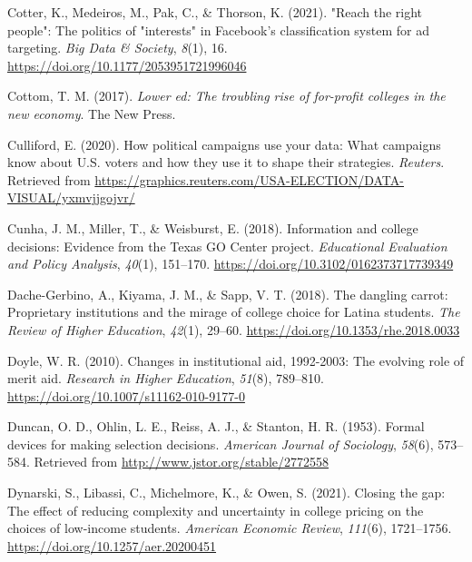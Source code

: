 \documentclass[
  12pt,
]{article}
\newlength{\cslhangindent}
\newlength{\cslentryspacingunit} %
\newenvironment{CSLReferences}[2] %
 {%
  \setlength{\parindent}{0pt}
  \ifodd #1
  \let\oldpar\par
  \def\par{\hangindent=\cslhangindent\oldpar}
  \fi
  \setlength{\parskip}{#2\cslentryspacingunit}
 }%
 {}
\begin{document}
\begin{CSLReferences}{1}{0}
\leavevmode{}%
Cotter, K., Medeiros, M., Pak, C., \& Thorson, K. (2021). "Reach the right people": The politics of "interests" in {F}acebook's classification system for ad targeting. \emph{Big Data \& Society}, \emph{8}(1), 16. \url{https://doi.org/10.1177/2053951721996046}

\leavevmode{}%
Cottom, T. M. (2017). \emph{Lower ed: {The} troubling rise of for-profit colleges in the new economy}. The New Press.

\leavevmode{}%
Culliford, E. (2020). How political campaigns use your data: {What} campaigns know about {U.S.} {voters} and how they use it to shape their strategies. \emph{Reuters}. Retrieved from \url{https://graphics.reuters.com/USA-ELECTION/DATA-VISUAL/yxmvjjgojvr/}

\leavevmode{}%
Cunha, J. M., Miller, T., \& Weisburst, E. (2018). Information and college decisions: Evidence from the {Texas GO Center} project. \emph{Educational Evaluation and Policy Analysis}, \emph{40}(1), 151--170. \url{https://doi.org/10.3102/0162373717739349}

\leavevmode{}%
Dache-Gerbino, A., Kiyama, J. M., \& Sapp, V. T. (2018). The dangling carrot: {Proprietary} institutions and the mirage of college choice for {Latina} students. \emph{The Review of Higher Education}, \emph{42}(1), 29--60. \url{https://doi.org/10.1353/rhe.2018.0033}

\leavevmode{}%
Doyle, W. R. (2010). Changes in institutional aid, 1992-2003: The evolving role of merit aid. \emph{Research in Higher Education}, \emph{51}(8), 789--810. \url{https://doi.org/10.1007/s11162-010-9177-0}

\leavevmode{}%
Duncan, O. D., Ohlin, L. E., Reiss, A. J., \& Stanton, H. R. (1953). Formal devices for making selection decisions. \emph{American Journal of Sociology}, \emph{58}(6), 573--584. Retrieved from \url{http://www.jstor.org/stable/2772558}

\leavevmode{}%
Dynarski, S., Libassi, C., Michelmore, K., \& Owen, S. (2021). Closing the gap: The effect of reducing complexity and uncertainty in college pricing on the choices of low-income students. \emph{American Economic Review}, \emph{111}(6), 1721--1756. \url{https://doi.org/10.1257/aer.20200451}


\end{CSLReferences}
\end{document}
